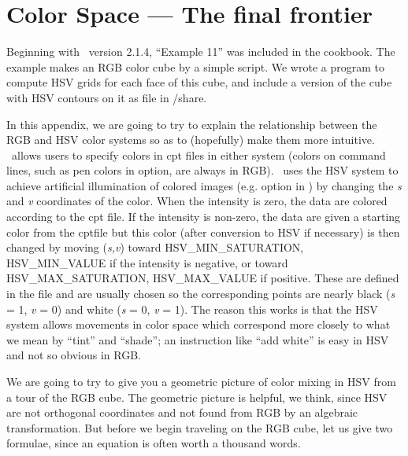%
%
\chapter{Color Space --- The final frontier}
\thispagestyle{headings}

Beginning with \GMT\ version 2.1.4, ``Example 11'' was included in
the cookbook.  The example makes an RGB color cube by a simple
 script.  We wrote a program to compute HSV grids for
each face of this cube, and include a version of the cube with
HSV contours on it as file  in /share.


In this appendix, we are going to try to explain the relationship
between the RGB and HSV color systems so as to (hopefully) make
them more intuitive.  \GMT\ allows users to specify colors in cpt
files in either system (colors on command lines, such as pen colors
in  option, are always in RGB).  \GMT\ uses the HSV system to
achieve artificial illumination of colored images (e.g. 
option in ) by changing the {\it s} and {\it v}
coordinates of the color.  When the intensity is zero, the data
are colored according to the cpt file.  If the intensity is
non-zero, the data are given a starting color from the cptfile
but this color (after conversion to HSV if necessary) is then
changed by moving ({\it s,}{\it v}) toward HSV\_MIN\_SATURATION,
HSV\_MIN\_VALUE if the intensity is negative, or toward
HSV\_MAX\_SATURATION, HSV\_MAX\_VALUE if positive.  These are
defined in the  file and are usually
chosen so the corresponding points are nearly black ({\it s} = 1,
{\it v} = 0) and white ({\it s} = 0, {\it v} = 1).
The reason this works is that the HSV system allows movements in
color space which correspond more closely to what we mean by
``tint'' and ``shade''; an instruction like ``add white'' is
easy in HSV and not so obvious in RGB.

We are going to try to give you a geometric picture of color
mixing in HSV from a tour of the RGB cube.  The geometric
picture is helpful, we think, since HSV are not orthogonal
coordinates and not found from RGB by an algebraic transformation.
But before we begin traveling on the RGB cube, let us give two
formulae, since an equation is often worth a thousand words. \\

